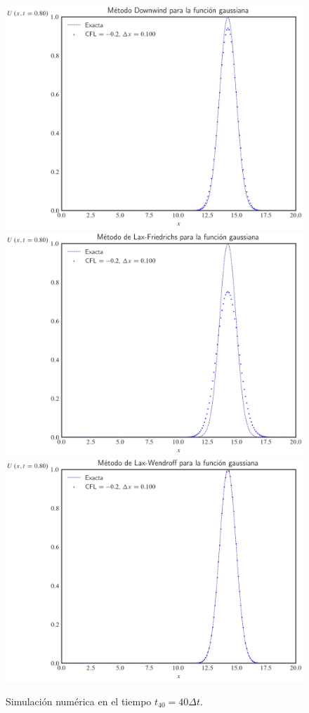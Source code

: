 \begin{figure}[ht!]
    \centering
    \includegraphics[width=.30\paperwidth]{../snapshots/downwindgaussian1d-40.png}
    \includegraphics[width=.30\paperwidth]{../snapshots/lax-friedrichsgaussiana1d-40.png}
    \includegraphics[width=.30\paperwidth]{../snapshots/lax-wendroffgaussiana1d-40.png}
    \caption{Simulación numérica en el tiempo $t_{40}=40\Delta t$.}
    \label{fig:example1t40}
\end{figure}


